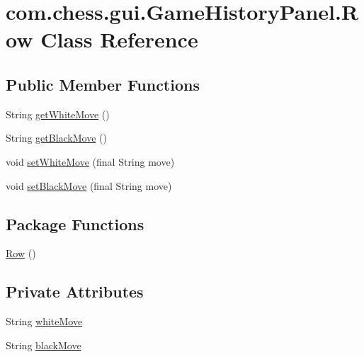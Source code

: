 \hypertarget{classcom_1_1chess_1_1gui_1_1_game_history_panel_1_1_row}{}\section{com.\+chess.\+gui.\+Game\+History\+Panel.\+Row Class Reference}
\label{classcom_1_1chess_1_1gui_1_1_game_history_panel_1_1_row}
\subsection*{Public Member Functions}
\begin{DoxyCompactItemize}
\item 
String \mbox{\hyperlink{classcom_1_1chess_1_1gui_1_1_game_history_panel_1_1_row_a100d20884c4a79734a30dd1fb9f597f4}{get\+White\+Move}} ()
\item 
String \mbox{\hyperlink{classcom_1_1chess_1_1gui_1_1_game_history_panel_1_1_row_a96cb8748eb0fd069b1bcbfb572a7dea6}{get\+Black\+Move}} ()
\item 
void \mbox{\hyperlink{classcom_1_1chess_1_1gui_1_1_game_history_panel_1_1_row_aadc55e06ff41b1c6fea3f67083950501}{set\+White\+Move}} (final String move)
\item 
void \mbox{\hyperlink{classcom_1_1chess_1_1gui_1_1_game_history_panel_1_1_row_a9a94fa957521d78f31b34a30e98b04b3}{set\+Black\+Move}} (final String move)
\end{DoxyCompactItemize}
\subsection*{Package Functions}
\begin{DoxyCompactItemize}
\item 
\mbox{\hyperlink{classcom_1_1chess_1_1gui_1_1_game_history_panel_1_1_row_ae5bcbc31817a01bc11b1652fbd720df6}{Row}} ()
\end{DoxyCompactItemize}
\subsection*{Private Attributes}
\begin{DoxyCompactItemize}
\item 
String \mbox{\hyperlink{classcom_1_1chess_1_1gui_1_1_game_history_panel_1_1_row_ae9107b2e25a0c9330fc89c14b1458c75}{white\+Move}}
\item 
String \mbox{\hyperlink{classcom_1_1chess_1_1gui_1_1_game_history_panel_1_1_row_a2a89bfa4d74a7e133dddce4cf32a37aa}{black\+Move}}
\end{DoxyCompactItemize}


